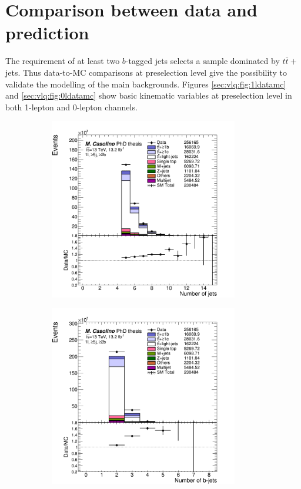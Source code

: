 \section{Comparison between data and prediction}
The requirement of at least two $b$-tagged jets selects a sample dominated by $t\bar{t}+$jets. Thus data-to-MC comparisons at preselection level give the possibility to validate the modelling of the main backgrounds. Figures \ref{sec:vlq:fig:1ldatamc} and \ref{sec:vlq:fig:0ldatamc} show basic kinematic variables at preselection level  in both 1-lepton and 0-lepton channels.
 

\begin{figure}[p]
\begin{subfigure}{0.33\textwidth}
  \centering
  \includegraphics[width=0.9\textwidth]{figures/VLQ/presel/1lep/canv_c1l2b_jets_n.png}
  \caption{}
  \label{}
\end{subfigure}
\begin{subfigure}{0.33\textwidth}
  \centering
  \includegraphics[width=0.9\textwidth]{figures/VLQ/presel/1lep/canv_c1l2b_bjets_n.png}

\end{subfigure}
\end{figure}

